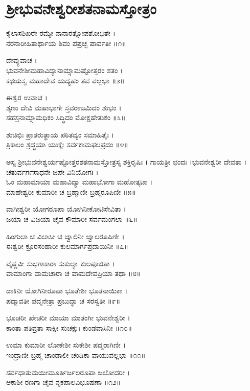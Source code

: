 \section{ಶ್ರೀಭುವನೇಶ್ವರೀಶತನಾಮಸ್ತೋತ್ರಂ}

ಕೈಲಾಸಶಿಖರೇ ರಮ್ಯೇ ನಾನಾರತ್ನೋಪಶೋಭಿತೇ ।\\
ನರನಾರೀಹಿತಾರ್ಥಾಯ ಶಿವಂ ಪಪ್ರಚ್ಛ ಪಾರ್ವತೀ ॥೧॥

ದೇವ್ಯುವಾಚ ।\\
ಭುವನೇಶೀಮಹಾವಿದ್ಯಾನಾಮ್ನಾಮಷ್ಟೋತ್ತರಂ ಶತಂ ।\\
ಕಥಯಸ್ವ ಮಹಾದೇವ ಯದ್ಯಹಂ ತವ ವಲ್ಲಭಾ ॥೨॥

ಈಶ್ವರ ಉವಾಚ ।\\
ಶೃಣು ದೇವಿ ಮಹಾಭಾಗೇ ಸ್ತವರಾಜಮಿದಂ ಶುಭಂ ।\\
ಸಹಸ್ರನಾಮ್ನಾಮಧಿಕಂ ಸಿದ್ಧಿದಂ ಮೋಕ್ಷಹೇತುಕಂ ॥೩॥

ಶುಚಿಭಿಃ ಪ್ರಾತರುತ್ಥಾಯ ಪಠಿತವ್ಯಂ ಸಮಾಹಿತೈಃ ।\\
ತ್ರಿಕಾಲಂ ಶ್ರದ್ಧಯಾ ಯುಕ್ತೈಃ ಸರ್ವಕಾಮಫಲಪ್ರದಂ ॥೪॥

ಅಸ್ಯ ಶ್ರೀಭುವನೇಶ್ವರ್ಯಷ್ಟೋತ್ತರಶತನಾಮಸ್ತೋತ್ರಸ್ಯ ಶಕ್ತಿರೃಷಿಃ  । ಗಾಯತ್ರೀ ಛಂದಃ ।ಭುವನೇಶ್ವರೀ ದೇವತಾ । ಚತುರ್ವರ್ಗಸಾಧನೇ ಜಪೇ ವಿನಿಯೋಗಃ ।\\

ಓಂ ಮಹಾಮಾಯಾ ಮಹಾವಿದ್ಯಾ ಮಹಾಭೋಗಾ ಮಹೋತ್ಕಟಾ ।\\
ಮಾಹೇಶ್ವರೀ ಕುಮಾರೀ ಚ ಬ್ರಹ್ಮಾಣೀ ಬ್ರಹ್ಮರೂಪಿಣೀ ॥೫॥

ವಾಗೀಶ್ವರೀ ಯೋಗರೂಪಾ ಯೋಗಿನೀಕೋಟಿಸೇವಿತಾ ।\\
ಜಯಾ ಚ ವಿಜಯಾ ಚೈವ ಕೌಮಾರೀ ಸರ್ವಮಂಗಲಾ ॥೬॥

ಹಿಂಗುಲಾ ಚ ವಿಲಾಸೀ ಚ ಜ್ವಾಲಿನೀ ಜ್ವಾಲರೂಪಿಣೀ ।\\
ಈಶ್ವರೀ ಕ್ರೂರಸಂಹಾರೀ ಕುಲಮಾರ್ಗಪ್ರದಾಯಿನೀ ॥೭॥

ವೈಷ್ಣವೀ ಸುಭಗಾಕಾರಾ ಸುಕುಲ್ಯಾ ಕುಲಪೂಜಿತಾ ।\\
ವಾಮಾಂಗಾ ವಾಮಚಾರಾ ಚ ವಾಮದೇವಪ್ರಿಯಾ ತಥಾ ॥೮॥

ಡಾಕಿನೀ ಯೋಗಿನೀರೂಪಾ ಭೂತೇಶೀ ಭೂತನಾಯಿಕಾ ।\\
ಪದ್ಮಾವತೀ ಪದ್ಮನೇತ್ರಾ ಪ್ರಬುದ್ಧಾ ಚ ಸರಸ್ವತೀ ॥೯॥

ಭೂಚರೀ ಖೇಚರೀ ಮಾಯಾ ಮಾತಂಗೀ ಭುವನೇಶ್ವರೀ ।\\
ಕಾಂತಾ ಪತಿವ್ರತಾ ಸಾಕ್ಷೀ ಸುಚಕ್ಷುಃ ಕುಂಡವಾಸಿನೀ ॥೧೦॥

ಉಮಾ ಕುಮಾರೀ ಲೋಕೇಶೀ ಸುಕೇಶೀ ಪದ್ಮರಾಗಿಣೀ ।\\
ಇಂದ್ರಾಣೀ ಬ್ರಹ್ಮ ಚಾಂಡಾಲೀ ಚಂಡಿಕಾ ವಾಯುವಲ್ಲಭಾ ॥೧೧॥

ಸರ್ವಧಾತುಮಯೀಮೂರ್ತಿರ್ಜಲರೂಪಾ ಜಲೋದರೀ ।\\
ಆಕಾಶೀ ರಣಗಾ ಚೈವ ನೃಕಪಾಲವಿಭೂಷಣಾ ॥೧೨॥

